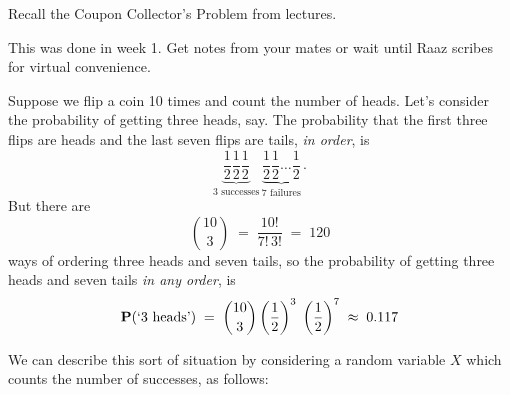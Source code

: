 \begin{Exercise}[title={Coupon Collector's Probem},label={xCouponCollPr}]
Recall the Coupon Collector's Problem from lectures.%
\end{Exercise}
\begin{Answer}
This was done in week 1. Get notes from your mates or wait until Raaz scribes for virtual convenience.
\end{Answer}

\begin{example}\label{Exmp:Flip10times}
Suppose we flip a coin 10 times and count the number of heads.  Let's consider the probability of getting three  heads, say. 
The probability that the first three flips are heads and the last  seven  flips are tails, \emph{in order},  is \[ \underbrace{\frac{1}{2} \frac{1}{2}
    \frac{1}{2}}_{3 \text{ successes}}
  \,\underbrace{\frac{1}{2} \frac{1}{2} \dots \frac{1}{2}}_{7
    \text{ failures}} \, .\]
But there are \[\binom{10}{3} \;=\; \frac{10!}{7!\, 3!}\;=\;120 \] ways
of ordering three heads and seven tails,  so the
  probability  of getting three  heads and seven  tails \emph{in any order},  is\[\mathbf{P}( \text{`} 3 \text{ heads'}) \;=\; \binom{10}{3}  \left(\frac{1}{2}\right)^3
  \;\left(\frac{1}{2}\right)^7 \;\approx\; 0.117\]
\end{example}

We can describe  this sort of situation by considering a random variable $X$ which counts the number of successes, as follows:

\remove{
The RV $Y$ in \hyperref[T:T3XRVs]{Table \ref*{T:T3XRVs}} may be generalized to an experiment $\E{E}_{\theta}^{n}$ with $n$ coin tosses.  
Let $X_i$ be the Indicator function of the event `Heads on the $i$-th toss' as before.  Then $Y$ defined by,
 \[
 Y := \sum_{i=1}^n X_i := X_1 + X_2 + \cdots + X_n  \ ,
 \]
is the number of `Heads' in $n$ tosses.  
Akin to the second row of \hyperref[T:T3XRVs]{Table \ref*{T:T3XRVs}}, for the `Toss $n$ times' experiment $\E{E}_{\theta}^{n}$ the
RV $Y$ as defined above will take values in $\{0,1,2,\ldots,n\}$ and is therefore a discrete RV.  This is called the Binomial RV as defined next.  
But, first we remind ourselves of some elementary definitions involving arrangements of objects from a collection (recall \hyperref[S:PermsFactsCombs]{Section~\ref*{S:PermsFactsCombs}}).
}

